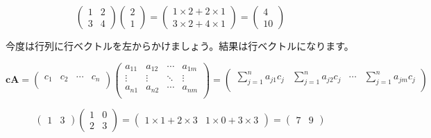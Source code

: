 \documentclass{ltjsbook}
\begin{document}
\begin{equation*}
    \begin{pmatrix}
        1 & 2 \\ 3 & 4
    \end{pmatrix}
    \begin{pmatrix}
        2 \\1
    \end{pmatrix}
    =
    \begin{pmatrix}
        1 \times 2 + 2 \times 1 \\
        3 \times 2 + 4 \times 1
    \end{pmatrix}
    =
    \begin{pmatrix}
        4 \\10
    \end{pmatrix}
\end{equation*}


今度は行列に行ベクトルを左からかけましょう。結果は行ベクトルになります。

\begin{equation*}
    \bm{c} \bm{A} =
    \begin{pmatrix}
        c_1 & c_2 & \cdots & c_n \\
    \end{pmatrix}
    \begin{pmatrix}
        a_{11} & a_{12} & \cdots & a_{1m} \\
        \vdots & \vdots & \ddots & \vdots \\
        a_{n1} & a_{n2} & \cdots & a_{nm} \\
    \end{pmatrix}
    =
    \begin{pmatrix}
        \displaystyle{\sum_{j=1}^{n}a_{j1}c_{j}} & \displaystyle{\sum_{j=1}^{n} a_{j2}c_{j}} & \cdots & \displaystyle{\sum_{j=1}^{n} a_{jm}c_{j}} \\
    \end{pmatrix}
\end{equation*}

\begin{equation*}
    \begin{pmatrix}
        1 & 3
    \end{pmatrix}
    \begin{pmatrix}
        1 & 0 \\
        2 & 3
    \end{pmatrix}
    =
    \begin{pmatrix}
        1 \times 1 + 2 \times 3 & 1\times 0+3 \times 3
    \end{pmatrix}
    =
    \begin{pmatrix}
        7 & 9
    \end{pmatrix}
\end{equation*}
\end{document}
